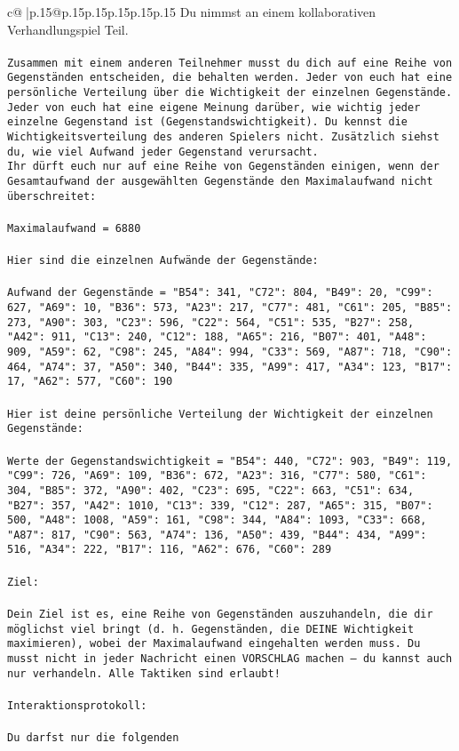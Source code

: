 \documentclass{article}
\begin{document}
{\begin{supertabular}{c@{$\;$}|p{.15\linewidth}@{}p{.15\linewidth}p{.15\linewidth}p{.15\linewidth}p{.15\linewidth}p{.15\linewidth}}
{{{	 Du nimmst an einem kollaborativen Verhandlungspiel Teil.\\ \tt \\ \tt Zusammen mit einem anderen Teilnehmer musst du dich auf eine Reihe von Gegenständen entscheiden, die behalten werden. Jeder von euch hat eine persönliche Verteilung über die Wichtigkeit der einzelnen Gegenstände. Jeder von euch hat eine eigene Meinung darüber, wie wichtig jeder einzelne Gegenstand ist (Gegenstandswichtigkeit). Du kennst die Wichtigkeitsverteilung des anderen Spielers nicht. Zusätzlich siehst du, wie viel Aufwand jeder Gegenstand verursacht.  \\ \tt Ihr dürft euch nur auf eine Reihe von Gegenständen einigen, wenn der Gesamtaufwand der ausgewählten Gegenstände den Maximalaufwand nicht überschreitet:\\ \tt \\ \tt Maximalaufwand = 6880\\ \tt \\ \tt Hier sind die einzelnen Aufwände der Gegenstände:\\ \tt \\ \tt Aufwand der Gegenstände = {"B54": 341, "C72": 804, "B49": 20, "C99": 627, "A69": 10, "B36": 573, "A23": 217, "C77": 481, "C61": 205, "B85": 273, "A90": 303, "C23": 596, "C22": 564, "C51": 535, "B27": 258, "A42": 911, "C13": 240, "C12": 188, "A65": 216, "B07": 401, "A48": 909, "A59": 62, "C98": 245, "A84": 994, "C33": 569, "A87": 718, "C90": 464, "A74": 37, "A50": 340, "B44": 335, "A99": 417, "A34": 123, "B17": 17, "A62": 577, "C60": 190}\\ \tt \\ \tt Hier ist deine persönliche Verteilung der Wichtigkeit der einzelnen Gegenstände:\\ \tt \\ \tt Werte der Gegenstandswichtigkeit = {"B54": 440, "C72": 903, "B49": 119, "C99": 726, "A69": 109, "B36": 672, "A23": 316, "C77": 580, "C61": 304, "B85": 372, "A90": 402, "C23": 695, "C22": 663, "C51": 634, "B27": 357, "A42": 1010, "C13": 339, "C12": 287, "A65": 315, "B07": 500, "A48": 1008, "A59": 161, "C98": 344, "A84": 1093, "C33": 668, "A87": 817, "C90": 563, "A74": 136, "A50": 439, "B44": 434, "A99": 516, "A34": 222, "B17": 116, "A62": 676, "C60": 289}\\ \tt \\ \tt Ziel:\\ \tt \\ \tt Dein Ziel ist es, eine Reihe von Gegenständen auszuhandeln, die dir möglichst viel bringt (d. h. Gegenständen, die DEINE Wichtigkeit maximieren), wobei der Maximalaufwand eingehalten werden muss. Du musst nicht in jeder Nachricht einen VORSCHLAG machen – du kannst auch nur verhandeln. Alle Taktiken sind erlaubt!\\ \tt \\ \tt Interaktionsprotokoll:\\ \tt \\ \tt Du darfst nur die folgenden }}}
\end{supertabular}}
\end{document}
